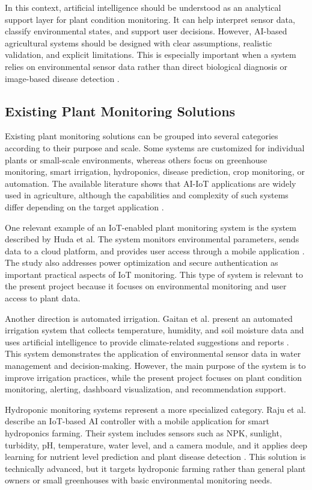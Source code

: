 In this context, artificial intelligence should be understood as an analytical support layer for plant condition monitoring. It can help interpret sensor data, classify environmental states, and support user decisions. However, AI-based agricultural systems should be designed with clear assumptions, realistic validation, and explicit limitations. This is especially important when a system relies on environmental sensor data rather than direct biological diagnosis or image-based disease detection \cite{qazi2022iot,miller2025iot,nawaz2025iot}.
\subsection{Existing Plant Monitoring Solutions}

Existing plant monitoring solutions can be grouped into several categories according to their purpose and scale. Some systems are customized for individual plants or small-scale environments, whereas others focus on greenhouse monitoring, smart irrigation, hydroponics, disease prediction, crop monitoring, or automation. The available literature shows that AI-IoT applications are widely used in agriculture, although the capabilities and complexity of such systems differ depending on the target application \cite{ahmed2024smart,mowla2023iot,wang2022development,luo2025formation}.

One relevant example of an IoT-enabled plant monitoring system is the system described by Huda et al. The system monitors environmental parameters, sends data to a cloud platform, and provides user access through a mobile application \cite{huda2024iot}. The study also addresses power optimization and secure authentication as important practical aspects of IoT monitoring. This type of system is relevant to the present project because it focuses on environmental monitoring and user access to plant data.

Another direction is automated irrigation. Gaitan et al. present an automated irrigation system that collects temperature, humidity, and soil moisture data and uses artificial intelligence to provide climate-related suggestions and reports \cite{gaitan2025integrating}. This system demonstrates the application of environmental sensor data in water management and decision-making. However, the main purpose of the system is to improve irrigation practices, while the present project focuses on plant condition monitoring, alerting, dashboard visualization, and recommendation support.

Hydroponic monitoring systems represent a more specialized category. Raju et al. describe an IoT-based AI controller with a mobile application for smart hydroponics farming. Their system includes sensors such as NPK, sunlight, turbidity, pH, temperature, water level, and a camera module, and it applies deep learning for nutrient level prediction and plant disease detection \cite{raju2022hydroponics}. This solution is technically advanced, but it targets hydroponic farming rather than general plant owners or small greenhouses with basic environmental monitoring needs.

